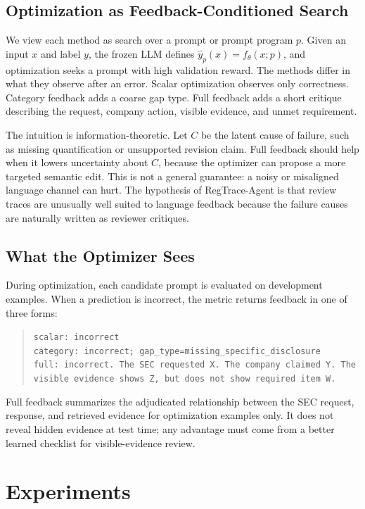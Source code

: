 \documentclass[11pt]{article}
\newcommand{\framework}{RegTrace-Agent}
\begin{document}
\subsection{Optimization as Feedback-Conditioned Search}

We view each method as search over a prompt or prompt program $p$. Given an input $x$ and label $y$, the frozen LLM defines $\hat{y}_{p}(x)=f_{\theta}(x;p)$, and optimization seeks a prompt with high validation reward. The methods differ in what they observe after an error. Scalar optimization observes only correctness. Category feedback adds a coarse gap type. Full feedback adds a short critique describing the request, company action, visible evidence, and unmet requirement.

The intuition is information-theoretic. Let $C$ be the latent cause of failure, such as missing quantification or unsupported revision claim. Full feedback should help when it lowers uncertainty about $C$, because the optimizer can propose a more targeted semantic edit. This is not a general guarantee: a noisy or misaligned language channel can hurt. The hypothesis of \framework{} is that review traces are unusually well suited to language feedback because the failure causes are naturally written as reviewer critiques.

\subsection{What the Optimizer Sees}

During optimization, each candidate prompt is evaluated on development examples. When a prediction is incorrect, the metric returns feedback in one of three forms:
\begin{quote}
\small
\texttt{scalar: incorrect}\\
\texttt{category: incorrect; gap\_type=missing\_specific\_disclosure}\\
\texttt{full: incorrect. The SEC requested X. The company claimed Y. The visible evidence shows Z, but does not show required item W.}
\end{quote}
Full feedback summarizes the adjudicated relationship between the SEC request, response, and retrieved evidence for optimization examples only. It does not reveal hidden evidence at test time; any advantage must come from a better learned checklist for visible-evidence review.

\section{Experiments}
\end{document}

